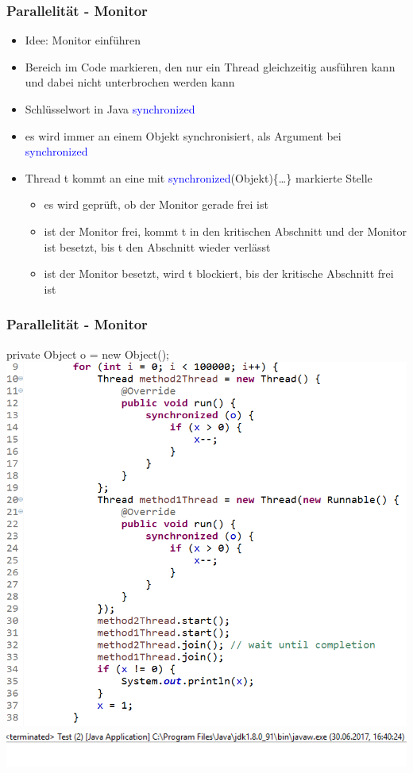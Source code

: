 \documentclass[18pt]{beamer}
\begin{document}
	\begin{frame}
		\frametitle{Parallelität - Monitor}
		\begin{itemize}
			\item Idee: Monitor einführen \pause
			\item Bereich im Code markieren, den nur ein Thread gleichzeitig ausführen kann und dabei nicht unterbrochen werden kann \pause
			\item Schlüsselwort in Java \textcolor{blue}{synchronized} \pause
			\item es wird immer an einem Objekt synchronisiert, als Argument bei \textcolor{blue}{synchronized} \pause
			\item Thread t kommt an eine mit \textcolor{blue}{synchronized}(Objekt)\{\dots\} markierte Stelle \pause
			\begin{itemize}
				\item es wird geprüft, ob der Monitor gerade frei ist \pause
				\item ist der Monitor frei, kommt t in den kritischen Abschnitt und der Monitor ist besetzt, bis t den Abschnitt wieder verlässt \pause
				\item ist der Monitor besetzt, wird t blockiert, bis der kritische Abschnitt frei ist
			\end{itemize}
		\end{itemize}
	\end{frame}

	\begin{frame}
		\frametitle{Parallelität - Monitor}
		private Object o = new Object();
		\includegraphics[scale=0.36]{./pics/tut5/synch-ex3.png} \pause
		\includegraphics[scale=0.39]{./pics/tut5/synch-ex4.png}
	\end{frame}
\end{document}
